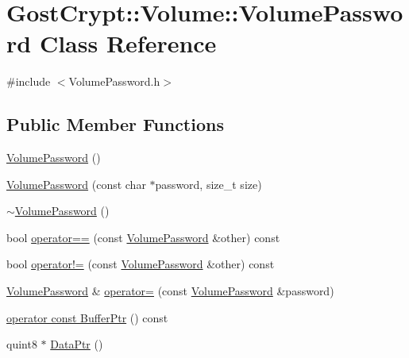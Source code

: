 \hypertarget{class_gost_crypt_1_1_volume_1_1_volume_password}{}\section{Gost\+Crypt\+:\+:Volume\+:\+:Volume\+Password Class Reference}
\label{class_gost_crypt_1_1_volume_1_1_volume_password}


{\ttfamily \#include $<$Volume\+Password.\+h$>$}

\subsection*{Public Member Functions}
\begin{DoxyCompactItemize}
\item 
\hyperlink{class_gost_crypt_1_1_volume_1_1_volume_password_af5f66521296f726b2ed21664bcb97666}{Volume\+Password} ()
\item 
\hyperlink{class_gost_crypt_1_1_volume_1_1_volume_password_a9743f2d9ab7a46e7445ff70cfa14b53d}{Volume\+Password} (const char $\ast$password, size\+\_\+t size)
\item 
\hyperlink{class_gost_crypt_1_1_volume_1_1_volume_password_a7fce52dd4c7940c92a9e517c62f7f738}{$\sim$\+Volume\+Password} ()
\item 
bool \hyperlink{class_gost_crypt_1_1_volume_1_1_volume_password_a23b802f513c0af399a7012f419e44be6}{operator==} (const \hyperlink{class_gost_crypt_1_1_volume_1_1_volume_password}{Volume\+Password} \&other) const
\item 
bool \hyperlink{class_gost_crypt_1_1_volume_1_1_volume_password_a13a3132f31b5470d5cabe91fa22c4e1c}{operator!=} (const \hyperlink{class_gost_crypt_1_1_volume_1_1_volume_password}{Volume\+Password} \&other) const
\item 
\hyperlink{class_gost_crypt_1_1_volume_1_1_volume_password}{Volume\+Password} \& \hyperlink{class_gost_crypt_1_1_volume_1_1_volume_password_acfae7086a762660313e259117aa90d4d}{operator=} (const \hyperlink{class_gost_crypt_1_1_volume_1_1_volume_password}{Volume\+Password} \&password)
\item 
\hyperlink{class_gost_crypt_1_1_volume_1_1_volume_password_a4276bf519df042dc771a762905043e5d}{operator const Buffer\+Ptr} () const
\item 
quint8 $\ast$ \hyperlink{class_gost_crypt_1_1_volume_1_1_volume_password_a2d7fc9486f348cd23369b51311c56142}{Data\+Ptr} ()
\item 

\end{DoxyCompactItemize}

